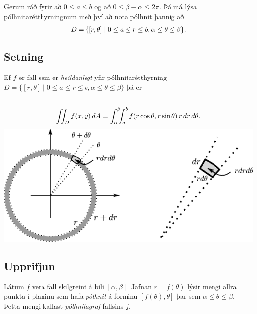\documentclass[a4paper,10pt,icelandic]{sphinxmanual}
\begin{document}
Gerum ráð fyrir að \(0\leq a\leq b\) og að
\(0\leq\beta-\alpha\leq
2\pi\). Þá má lýsa pólhnitarétthyrningnum með því að nota pólhnit þannig
að
\begin{gather}
\begin{split}\displaystyle D=\{[r,\theta]\mid 0\leq a\leq r\leq b, \alpha\leq \theta\leq\beta\}.\end{split}\notag
\end{gather}

\subsection{Setning}
\label{Kafli4:id11}
Ef \(f\) er fall sem er \textit{heildanlegt} yfir pólhnitarétthyrning
\(D=\{[r,\theta]\mid 0\leq a\leq r\leq b, \alpha\leq \theta\leq\beta\}\)
þá er
\begin{gather}
\begin{split}\displaystyle\end{split}\notag\\\begin{split}\int\!\!\!\int_D f(x,y)\,dA=\int_\alpha^\beta\!\!\!\int_{a}^{b}
f(r\cos\theta,r\sin\theta)\,r\,dr\, d\theta.\end{split}\notag
\end{gather}
{\hfill\includegraphics[width=0.900\linewidth]{polarelement.png}\hfill}


\subsection{Upprifjun}
\label{Kafli4:id12}\label{Kafli4:index-10}
Látum \(f\) vera fall skilgreint á bili \([\alpha,\beta]\).
Jafnan \(r=f(\theta)\) lýsir mengi allra punkta í planinu sem hafa
\textit{pólhnit} á forminu \([f(\theta),\theta]\) þar sem
\(\alpha\leq\theta\leq\beta\). Þetta mengi kallast \emph{pólhnitagraf}
fallsins \(f\).
\end{document}
